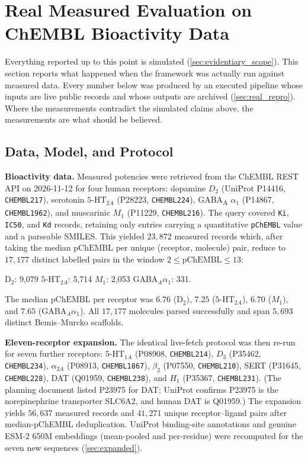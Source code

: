 
\section{Real Measured Evaluation on ChEMBL Bioactivity Data}
\label{sec:real_eval}

Everything reported up to this point is simulated (\cref{sec:evidentiary_scope}). This section reports what happened when the framework was actually run against measured data. Every number below was produced by an executed pipeline whose inputs are live public records and whose outputs are archived (\cref{sec:real_repro}). Where the measurements contradict the simulated claims above, the measurements are what should be believed.

\subsection{Data, Model, and Protocol}

\textbf{Bioactivity data.} Measured potencies were retrieved from the ChEMBL REST API on 2026-11-12 for four human receptors: dopamine $D_2$ (UniProt P14416, \texttt{CHEMBL217}), serotonin $5\text{-HT}_{2A}$ (P28223, \texttt{CHEMBL224}), GABA\textsubscript{A} $\alpha_1$ (P14867, \texttt{CHEMBL1962}), and muscarinic $M_1$ (P11229, \texttt{CHEMBL216}). The query covered \texttt{Ki}, \texttt{IC50}, and \texttt{Kd} records, retaining only entries carrying a quantitative \texttt{pChEMBL} value and a parseable SMILES. This yielded $23{,}872$ measured records which, after taking the median $\text{pChEMBL}$ per unique (receptor, molecule) pair, reduce to $17{,}177$ distinct labelled pairs in the window $2 \le \text{pChEMBL} \le 13$:
\begin{center}
\small
D$_2$: 9{,}079 \quad $5\text{-HT}_{2A}$: 5{,}714 \quad $M_1$: 2{,}053 \quad GABA$_A\alpha_1$: 331.
\end{center}
The median $\text{pChEMBL}$ per receptor was $6.76$ (D$_2$), $7.25$ ($5\text{-HT}_{2A}$), $6.70$ ($M_1$), and $7.65$ (GABA$_A\alpha_1$). All $17{,}177$ molecules parsed successfully and span $5{,}693$ distinct Bemis--Murcko scaffolds.

\textbf{Eleven-receptor expansion.} The identical live-fetch protocol was then re-run for seven further receptors: $5\text{-HT}_{1A}$ (P08908, \texttt{CHEMBL214}), $D_3$ (P35462, \texttt{CHEMBL234}), $\alpha_{2A}$ (P08913, \texttt{CHEMBL1867}), $\beta_2$ (P07550, \texttt{CHEMBL210}), SERT (P31645, \texttt{CHEMBL228}), DAT (Q01959, \texttt{CHEMBL238}), and $H_1$ (P35367, \texttt{CHEMBL231}). (The planning document listed P23975 for DAT; UniProt confirms P23975 is the norepinephrine transporter SLC6A2, and human DAT is Q01959.) The expansion yields $56{,}637$ measured records and $41{,}271$ unique receptor--ligand pairs after median-pChEMBL deduplication. UniProt binding-site annotations and genuine ESM-2 650M embeddings (mean-pooled and per-residue) were recomputed for the seven new sequences (\cref{sec:expanded}).

